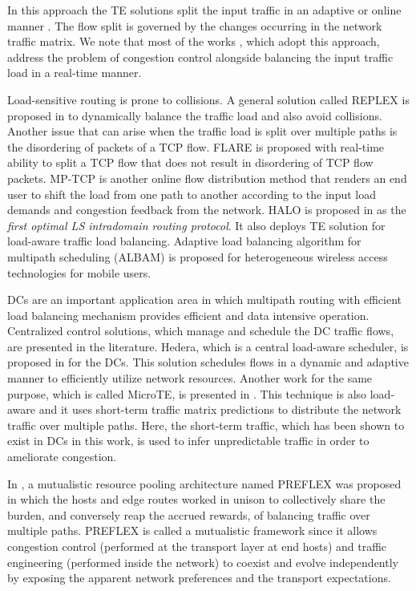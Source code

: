 \documentclass[10pt]{IEEEtran}
\begin{document}
In this approach the TE solutions split the input traffic in an adaptive or online manner \cite{elwalid2001mate, kandula2005texcp, wang2006cope, he2008multiple}. The flow split is governed by the changes occurring in the network traffic matrix. We note that most of the works \cite{elwalid2001mate, kandula2005texcp, he2007towards}, which adopt this approach, address the problem of congestion control alongside balancing the input traffic load in a real-time manner.

Load-sensitive routing is prone to collisions. A general solution called REPLEX is proposed in \cite{fischer2006replex} to dynamically balance the traffic load and also avoid collisions. Another issue that can arise when the traffic load is split over multiple paths is the disordering of packets of a TCP flow. FLARE \cite{kandula2007dynamic} is proposed with real-time ability to split a TCP flow that does not result in disordering of TCP flow packets. MP-TCP \cite{ford2011architectural} is another online flow distribution method that renders an end user to shift the load from one path to another according to the input load demands and congestion feedback from the network. HALO is proposed in \cite{michael2013optimal} as the \textit{first optimal LS intradomain routing protocol}. It also deploys TE solution for load-aware traffic load balancing. Adaptive load balancing algorithm for multipath scheduling (ALBAM) is proposed for heterogeneous wireless access technologies for mobile users.

DCs are an important application area in which multipath routing with efficient load balancing mechanism provides efficient and data intensive operation. Centralized control solutions, which manage and schedule the DC traffic flows, are presented in the literature. Hedera, which is a central load-aware scheduler, is proposed in \cite{al2010hedera} for the DCs. This solution schedules flows in a dynamic and adaptive manner to efficiently utilize network resources. Another work for the same purpose, which is called MicroTE, is presented in \cite{ford2011architectural}. This technique is also load-aware and it uses short-term traffic matrix predictions to distribute the network traffic over multiple paths. Here, the short-term traffic, which has been shown to exist in DCs in this work, is used to infer unpredictable traffic in order to ameliorate congestion.

In \cite{araujo2010mutualistic}, a mutualistic resource pooling architecture named PREFLEX was proposed in which the hosts and edge routes worked in unison to collectively share the burden, and conversely reap the accrued rewards, of balancing traffic over multiple paths. PREFLEX is called a mutualistic framework since it allows congestion control (performed at the transport layer at end hosts) and traffic engineering (performed inside the network) to coexist and evolve independently by exposing the apparent network preferences and the transport expectations.
\end{document}
